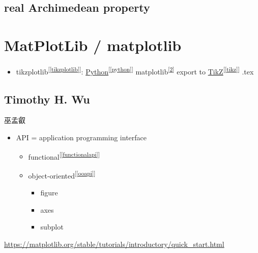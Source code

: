 \documentclass[
]{book}
\providecommand{\tightlist}{%
  \setlength{\itemsep}{0pt}\setlength{\parskip}{0pt}}
\theoremstyle{definition}
\theoremstyle{definition}
\theoremstyle{definition}
\theoremstyle{definition}
\theoremstyle{remark}
\begin{document}
\hypertarget{real-archimedean-property}{%
\section{real Archimedean property}\label{real-archimedean-property}}

\hypertarget{matplotlib}{%
\chapter{MatPlotLib / matplotlib}\label{matplotlib}}

\begin{itemize}
\tightlist
\item
  tikzplotlib\textsuperscript{{[}\ref{tikzplotlib}{]}}: \protect\hyperlink{python}{Python}\textsuperscript{{[}\ref{python}{]}} matplotlib\textsuperscript{{[}\ref{matplotlib}{]}} export to \protect\hyperlink{tikz}{TikZ}\textsuperscript{{[}\ref{tikz}{]}} .tex
\end{itemize}

\hypertarget{timothy-h.-wu}{%
\section{Timothy H. Wu}\label{timothy-h.-wu}}

\begin{CJK}{UTF8}{bsmi}
巫孟叡
\end{CJK}

\begin{itemize}
\tightlist
\item
  API = application programming interface

  \begin{itemize}
  \tightlist
  \item
    functional\textsuperscript{{[}\ref{functionalapi}{]}}
  \item
    object-oriented\textsuperscript{{[}\ref{ooapi}{]}}

    \begin{itemize}
    \tightlist
    \item
      figure
    \item
      axes
    \item
      subplot
    \end{itemize}
  \end{itemize}
\end{itemize}

\url{https://matplotlib.org/stable/tutorials/introductory/quick_start.html}
\end{document}
